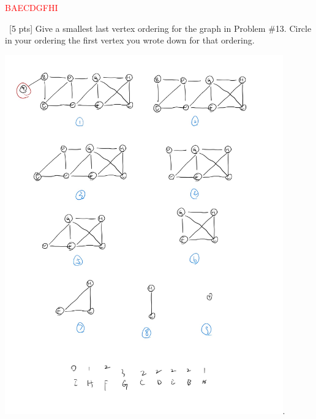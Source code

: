 \documentclass[12pt]{article}
\newenvironment{sol}[1][Solution]{\begin{trivlist}\item[\hskip\labelsep {\bfseries #1:}]}{\end{trivlist}}
\begin{document}
\begin{enumerate}
\begin{sol}
\begin{center}
         \end{center}
         \textcolor{red}{BAECDGFHI}
        \end{sol}

        \item \  [5 pts] Give a smallest last vertex ordering for the graph in Problem \#13. Circle in your ordering the first vertex you wrote down for that ordering.
                            \begin{center}
        \includegraphics[width=0.9\textwidth]{p9.JPG}.
        \end{center}
\end{enumerate}
\end{document}
